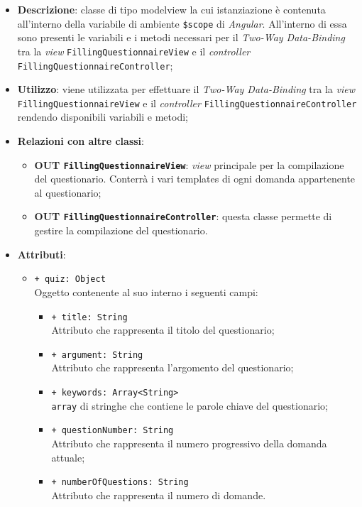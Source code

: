 	\begin{itemize}
		\item \textbf{Descrizione}: classe di tipo modelview la cui istanziazione è contenuta all'interno della variabile di ambiente \texttt{\$scope} di \textit{Angular}. All'interno di essa sono presenti le variabili e i metodi necessari per il \textit{Two-Way Data-Binding} tra la \textit{view} \texttt{FillingQuestionnaireView} e il \textit{controller} \texttt{FillingQuestionnaireController};
		\item \textbf{Utilizzo}: viene utilizzata per effettuare il \textit{Two-Way Data-Binding} tra la \textit{view}\\ \texttt{FillingQuestionnaireView} e il \textit{controller} \texttt{FillingQuestionnaireController} rendendo disponibili variabili e metodi;
		\item \textbf{Relazioni con altre classi}: 
		\begin{itemize}
			\item \textbf{OUT \texttt{FillingQuestionnaireView}}: \textit{view} principale per la compilazione del questionario. Conterrà i vari templates di ogni domanda appartenente al questionario; 
			\item \textbf{OUT \texttt{FillingQuestionnaireController}}: questa classe permette di gestire la compilazione del questionario.
		\end{itemize}
		\item \textbf{Attributi}: 
		\begin{itemize}
			\item \texttt{+ quiz: Object} \\ Oggetto contenente al suo interno i seguenti campi:
			\begin{itemize}
				\item \texttt{+ title: String} \\ Attributo che rappresenta il titolo del questionario;
				\item \texttt{+ argument: String} \\ Attributo che rappresenta l'argomento del questionario;
				\item \texttt{+ keywords: Array<String>} \\ \texttt{array} di stringhe che contiene le parole chiave del questionario;
				\item \texttt{+ questionNumber: String} \\ Attributo che rappresenta il numero progressivo della domanda attuale;
				\item \texttt{+ numberOfQuestions: String} \\ Attributo che rappresenta il numero di domande.

\end{itemize}
\end{itemize}
\end{itemize}
